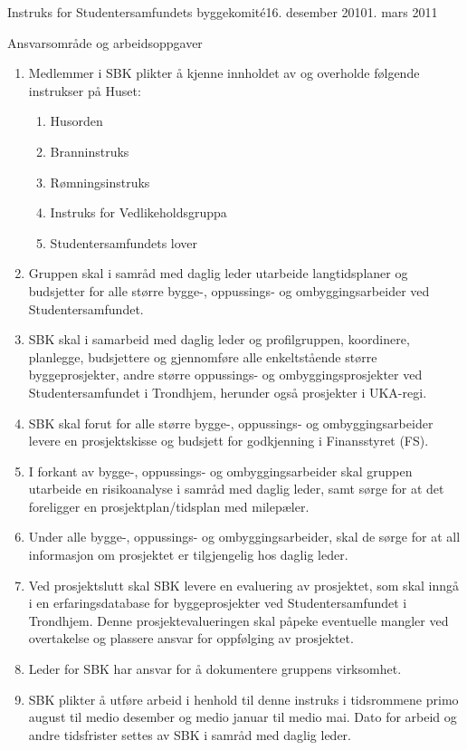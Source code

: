 \documentclass[../fsbok.tex]{subfiles}
\begin{document}
\begin{instruks}{Instruks for Studentersamfundets byggekomité}{16. desember 2010}{1. mars 2011}
    \begin{instruksledd}{ Ansvarsområde og arbeidsoppgaver}
        \begin{enumerate}
            \item Medlemmer i SBK plikter å kjenne innholdet av og overholde følgende instrukser på
                Huset:
                \begin{enumerate}
                    \item Husorden
                    \item Branninstruks
                    \item Rømningsinstruks
                    \item Instruks for Vedlikeholdsgruppa
                    \item Studentersamfundets lover
                \end{enumerate}
            \item Gruppen skal i samråd med daglig leder utarbeide langtidsplaner og
                budsjetter for alle større bygge-,
                oppussings- og ombyggingsarbeider ved Studentersamfundet.
            \item SBK skal i samarbeid med daglig leder og profilgruppen, koordinere,
                planlegge, budsjettere og gjennomføre
                alle enkeltstående større byggeprosjekter, andre større oppussings- og
                ombyggingsprosjekter ved Studentersamfundet i Trondhjem, herunder også prosjekter i UKA-regi.
	    \item SBK skal forut for alle større bygge-, oppussings- og ombyggingsarbeider levere en prosjektskisse og
                budsjett for godkjenning i Finansstyret (FS).
            \item I forkant av bygge-, oppussings- og ombyggingsarbeider skal gruppen
                utarbeide en risikoanalyse i samråd med daglig leder, samt sørge
		for at det foreligger en prosjektplan/tidsplan med milepæler.
            \item Under alle bygge-, oppussings- og ombyggingsarbeider, skal de sørge for
                at all informasjon om prosjektet er tilgjengelig hos daglig leder.
            \item Ved prosjektslutt skal SBK levere en evaluering av prosjektet, som skal inngå
                i en erfaringsdatabase for byggeprosjekter ved Studentersamfundet i Trondhjem. Denne
                prosjektevalueringen skal påpeke eventuelle
                mangler ved overtakelse og plassere ansvar for oppfølging av prosjektet.
            \item Leder for SBK har ansvar for å dokumentere gruppens virksomhet.
            \item SBK plikter å utføre arbeid i henhold til denne instruks i tidsrommene
                primo august til medio desember og medio januar til medio mai. Dato for arbeid og 
		andre tidsfrister settes av SBK i samråd med daglig leder.
        \end{enumerate}
    \end{instruksledd}


\end{instruks}
\end{document}
